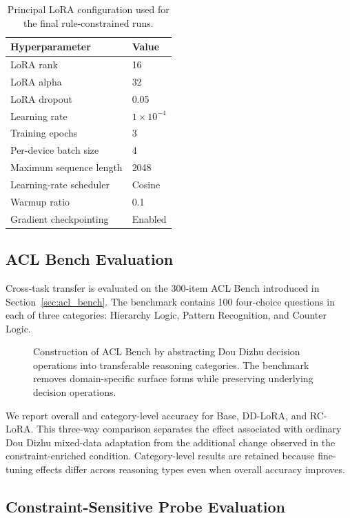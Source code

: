\begin{table}[t]
\centering
\caption{Principal LoRA configuration used for the final rule-constrained runs.}
\label{tab:lora_config}
\begin{tabular}{ll}
\toprule
\rowcolor{NeutralCell}
Hyperparameter & Value \\
\midrule
LoRA rank & 16 \\
LoRA alpha & 32 \\
LoRA dropout & 0.05 \\
Learning rate & $1\times10^{-4}$ \\
Training epochs & 3 \\
Per-device batch size & 4 \\
Maximum sequence length & 2048 \\
Learning-rate scheduler & Cosine \\
Warmup ratio & 0.1 \\
Gradient checkpointing & Enabled \\
\bottomrule
\end{tabular}
\end{table}

\subsection{ACL Bench Evaluation}
\label{sec:acl_evaluation}

Cross-task transfer is evaluated on the 300-item ACL Bench introduced in Section~\ref{sec:acl_bench}. The benchmark contains 100 four-choice questions in each of three categories: Hierarchy Logic, Pattern Recognition, and Counter Logic.

\begin{figure}[ht]
\centering

\caption{
Construction of ACL Bench by abstracting Dou Dizhu decision operations into transferable reasoning categories.
The benchmark removes domain-specific surface forms while preserving underlying decision operations.
}
\label{fig:aclbench}
\end{figure}

We report overall and category-level accuracy for Base, DD-LoRA, and RC-LoRA. This three-way comparison separates the effect associated with ordinary Dou Dizhu mixed-data adaptation from the additional change observed in the constraint-enriched condition. Category-level results are retained because fine-tuning effects differ across reasoning types even when overall accuracy improves.

\subsection{Constraint-Sensitive Probe Evaluation}
\label{sec:constraint_probe_setup}

